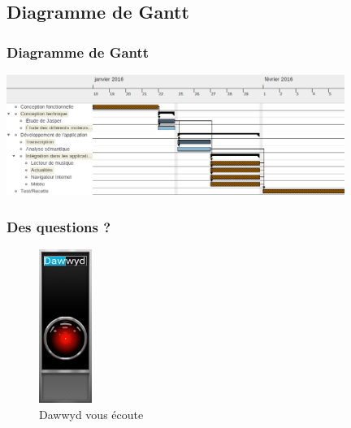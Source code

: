 \documentclass{beamer}
\begin{document}
\subsection{Diagramme de Gantt}

\begin{frame}
\frametitle{Diagramme de Gantt}
	\includegraphics[width=11cm]{gantt}
\end{frame}

\begin{frame}
\frametitle{Des questions ?}
\centering
\begin{figure}
    \includegraphics[height=5cm]{hal_dawwyd}
    \caption{Dawwyd vous écoute}
\end{figure}
\end{frame}
\end{document}
